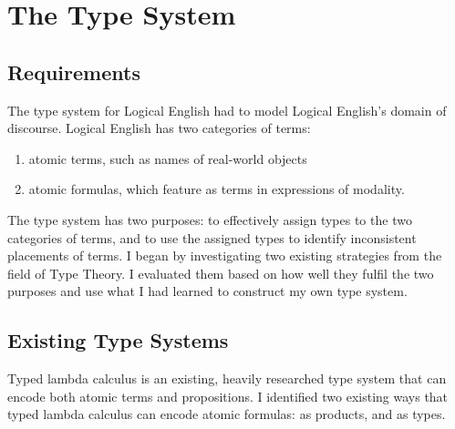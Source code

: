 \documentclass[../main.tex]{subfiles}
\begin{document}
\chapter{The Type System}
\section{Requirements}
The type system for Logical English had to model Logical English's domain of discourse. Logical English has two categories of terms:
\begin{enumerate}
    \item atomic terms, such as names of real-world objects
    \item atomic formulas, which feature as terms in expressions of modality.
\end{enumerate}
The type system has two purposes: to effectively assign types to the two categories of terms, and to use the assigned types to identify inconsistent placements of terms. I began by investigating two existing strategies from the field of Type Theory. I evaluated them based on how well they fulfil the two purposes and use what I had learned to construct my own type system.


\section{Existing Type Systems}
Typed lambda calculus is an existing, heavily researched type system that can encode both atomic terms and propositions. I identified two existing ways that typed lambda calculus can encode atomic formulas: as products, and as types.
\end{document}
